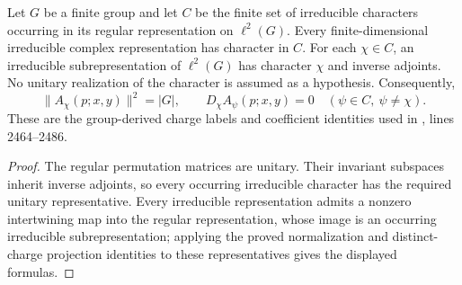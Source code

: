 \begin{lemma}
    \label{thm:peps_regular_charge_labels}
    \leanok
    Let $G$ be a finite group and let $C$ be the finite set of irreducible
    characters occurring in its regular representation on $\ell^2(G)$.
    Every finite-dimensional irreducible complex representation has character
    in $C$. For each $\chi\in C$, an irreducible subrepresentation
    of $\ell^2(G)$ has character $\chi$ and inverse adjoints.
    No unitary realization of the character is assumed as a hypothesis.
    Consequently,
    \[
        \|A_\chi(p;x,y)\|^2=|G|,
        \qquad D_\chi A_\psi(p;x,y)=0\quad(\psi\in C,\ \psi\ne\chi).
    \]
    These are the group-derived charge labels and coefficient identities used
    in \cite[charge detection]{Schuch2010PEPS}, lines 2464--2486.
\end{lemma}
\begin{proof}\leanok
    The regular permutation matrices are unitary. Their invariant subspaces
    inherit inverse adjoints, so every occurring irreducible character has
    the required unitary representative. Every irreducible representation
    admits a nonzero intertwining map into the regular representation, whose
    image is an occurring irreducible subrepresentation; applying the proved
    normalization and distinct-charge projection identities to these
    representatives gives the displayed formulas.
\end{proof}
